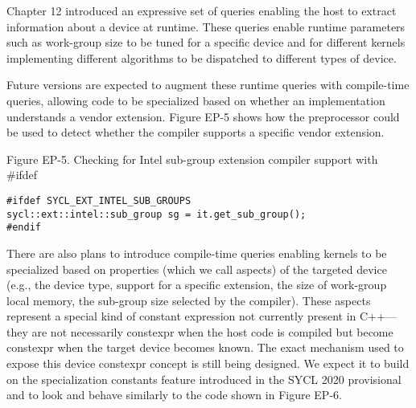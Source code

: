 Chapter 12 introduced an expressive set of queries enabling the host to extract information about a device at runtime. These queries enable runtime parameters such as work-group size to be tuned for a specific device and for different kernels implementing different algorithms to be dispatched to different types of device.\par

Future versions are expected to augment these runtime queries with compile-time queries, allowing code to be specialized based on whether an implementation understands a vendor extension. Figure EP-5 shows how the preprocessor could be used to detect whether the compiler supports a specific vendor extension.\par

\hspace*{\fill} \par %
Figure EP-5. Checking for Intel sub-group extension compiler support with \#ifdef
\begin{lstlisting}[caption={}]
#ifdef SYCL_EXT_INTEL_SUB_GROUPS
sycl::ext::intel::sub_group sg = it.get_sub_group();
#endif
\end{lstlisting}

There are also plans to introduce compile-time queries enabling kernels to be specialized based on properties (which we call aspects) of the targeted device (e.g., the device type, support for a specific extension, the size of work-group local memory, the sub-group size selected by the compiler). These aspects represent a special kind of constant expression not currently present in C++—they are not necessarily constexpr when the host code is compiled but become constexpr when the target device becomes known. The exact mechanism used to expose this device constexpr concept is still being designed. We expect it to build on the specialization constants feature introduced in the SYCL 2020 provisional and to look and behave similarly to the code shown in Figure EP-6.\par

